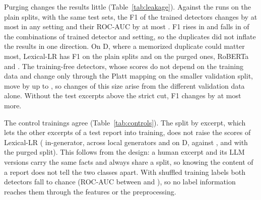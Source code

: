 \documentclass[journal]{IEEEtran}
\begin{document}
Purging changes the results little (Table~\ref{tab:leakage}). Against the runs on the plain splits, with the same
test sets, the F1 of the trained detectors changes by at most \LeakMaxDeltaPurgeFOne{} in any setting and their
ROC-AUC by at most \LeakMaxDeltaPurgeAuc{}. F1 rises in \LeakNUpPurgeFOne{} and falls in \LeakNDownPurgeFOne{} of
the \LeakNCompPurgeFOne{} combinations of trained detector and setting, so the duplicates did not inflate the
results in one direction. On D, where a memorized duplicate could matter most, Lexical-LR has F1
\LeakDLexlrPlain{} on the plain splits and \LeakDLexlrPurged{} on the purged ones, RoBERTa \LeakDTransPlain{} and
\LeakDTransPurged{}. The training-free detectors, whose scores do not depend on the training data and change only
through the Platt mapping on the smaller validation split, move by up to \LeakMaxDeltaZeroPurge{}, so changes of
this size arise from the different validation data alone. Without the test excerpts above the strict cut, F1 changes
by at most \LeakMaxDeltaStrictFOne{} more.

The control trainings agree (Table~\ref{tab:controls}). The split by excerpt, which lets the other excerpts of a test
report into training, does not raise the scores of Lexical-LR (\CtrlChunkInLexlr{} in-generator,
\CtrlChunkCrossLexlr{} across local generators and \CtrlChunkDLexlr{} on D, against \CtrlSourceInLexlr{},
\CtrlSourceCrossLexlr{} and \CtrlSourceDLexlr{} with the purged split). This follows from the design: a human excerpt
and its LLM versions carry the same facts and always share a split, so knowing the content of a report does not tell
the two classes apart. With shuffled training labels both detectors fall to chance (ROC-AUC between
\CtrlShuffledAucMin{} and \CtrlShuffledAucMax{}), so no label information reaches them through the features or the
preprocessing.
\end{document}
